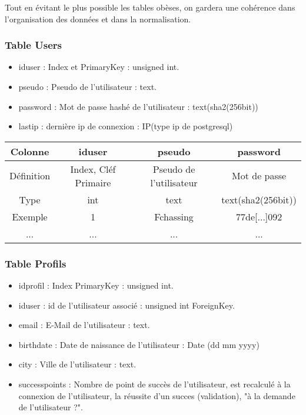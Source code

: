 \documentclass[a4paper,10pt]{article}
\begin{document}
Tout en évitant le plus possible les tables obèses, on gardera une cohérence dans l'organisation des données et dans la normalisation.

\subsubsection{Table Users}

\begin{itemize}
\item iduser : Index et PrimaryKey : unsigned int.
\item pseudo : Pseudo de l'utilisateur : text.
\item password : Mot de passe hashé de l'utilisateur : text(sha2(256bit))
\item lastip : dernière ip de connexion : IP(type ip de postgresql)
\end{itemize}

\begin{center}
\begin{tabular}{| c | c | c | c | }
\hline
Colonne & iduser & pseudo & password \\ \hline
Définition & Index, Cléf Primaire & Pseudo de l'utilisateur & Mot de passe\\ \hline
Type & int & text & text(sha2(256bit))\\ \hline
Exemple & 1 & Fchassing & 77de[...]092  \\ \hline
... & ... & ... & ... \\
\end{tabular}
\end{center}

\subsubsection{Table Profils}

\begin{itemize}
\item idprofil : Index PrimaryKey : unsigned int.
\item iduser : id de l'utilisateur associé : unsigned int ForeignKey.
\item email : E-Mail de l'utilisateur : text.
\item birthdate : Date de naissance de l'utilisateur : Date (dd mm yyyy)
\item city : Ville de l'utilisateur : text.
\item successpoints : Nombre de point de succès de l'utilisateur, est recalculé à la connexion de l'utilisateur, la réussite d'un succes (validation), "à la demande de l'utilisateur ?".
\end{itemize}
\end{document}
